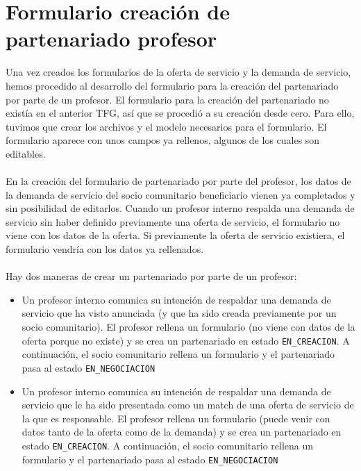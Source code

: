 \documentclass[11pt]{book}
\begin{document}
	\section{Formulario creación de partenariado profesor}
	Una vez creados los formularios de la oferta de servicio y la demanda de servicio, hemos procedido al desarrollo del formulario para la creación del partenariado por parte de un profesor.
	El formulario para la creación del partenariado no existía en el anterior TFG, así que se procedió a su creación desde cero. Para ello, tuvimos que crear los archivos y el modelo necesarios para el formulario. El formulario aparece con unos campos ya rellenos, algunos de los cuales son editables.\\\\
	En la creación del formulario de partenariado por parte del profesor, los datos de la demanda de servicio del socio comunitario beneficiario vienen ya completados y sin posibilidad de editarlos. Cuando un profesor interno respalda una demanda de servicio sin haber definido previamente una oferta de servicio, el formulario no viene con los datos de la oferta. Si previamente la oferta de servicio existiera, el formulario vendría con los datos ya rellenados.\\\\ 
	Hay dos maneras de crear un partenariado por parte de un profesor:
	\begin{itemize}
		\item Un profesor interno comunica su intención de respaldar una
		demanda de servicio que ha visto anunciada (y que ha sido creada
		previamente por un socio comunitario).
		El profesor rellena un formulario (no viene con datos de la oferta
		porque no existe) y se crea un partenariado en estado \texttt{EN\_CREACION}.
		A continuación, el socio comunitario rellena un formulario y el
		partenariado pasa al estado \texttt{EN\_NEGOCIACION}
		\item Un profesor interno comunica su intención de respaldar una
		demanda de servicio que le ha sido presentada como un match de una
		oferta de servicio de la que es responsable. El profesor rellena un formulario (puede venir con datos tanto de la oferta como de la demanda) y se crea un partenariado en estado \texttt{EN\_CREACION}. A continuación, el socio comunitario rellena un formulario y el partenariado pasa al estado \texttt{EN\_NEGOCIACION} \\\\
		
	\end{itemize}
\end{document}
